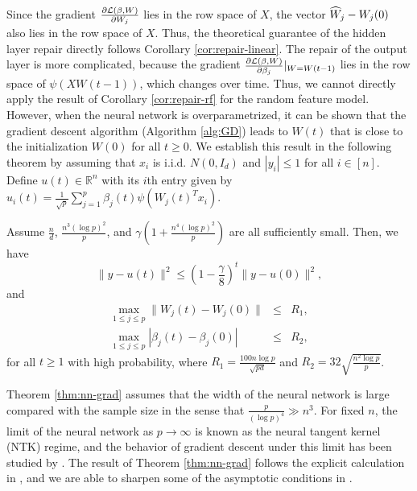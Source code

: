 Since the gradient $\frac{\partial {\mathcal L}(\beta,W)}{\partial W_j}$ lies in the row space of $X$, the vector $\widehat{W}_j-W_j(0)$ also lies in the row space of $X$. Thus, the theoretical guarantee of the hidden layer repair directly follows
Corollary \ref{cor:repair-linear}.
The repair of the output layer is more complicated, because the gradient $\frac{\partial {\mathcal L}(\beta,W)}{\partial \beta_j}|_{W=W(t-1)}$ lies in the row space of $\psi(XW(t-1))$, which changes over time. Thus, we cannot directly apply the result of Corollary \ref{cor:repair-rf} for the random feature model. However, when the neural network is overparametrized, it can be shown that the gradient descent algorithm (Algorithm \ref{alg:GD}) leads to $W(t)$ that is close to the initialization $W(0)$ for all $t\geq 0$. We establish this result in the following theorem by assuming that $x_i$ is i.i.d. $N(0,I_d)$ and $|y_i|\leq 1$ for all $i\in[n]$. Define $u(t)\in\mathbb{R}^n$ with its $i$th entry given by
$u_i(t)=\frac{1}{\sqrt{p}}\sum_{j=1}^p\beta_j(t)\psi(W_j(t)^Tx_i)$.
\vskip10pt
\begin{thm}\label{thm:nn-grad}
Assume $\frac{n}{d}$, $\frac{n^3(\log p)^2}{p}$, and $\gamma\left(1+\frac{n^4(\log p)^2}{p}\right)$ are all sufficiently small. Then, we have
\begin{equation}
\|y-u(t)\|^2 \leq \left(1-\frac{\gamma}{8}\right)^t\|y-u(0)\|^2, \label{eq:iter-function}
\end{equation}
and
\begin{eqnarray}
\label{eq:iter-parameter} \max_{1\leq j\leq p}\|W_j(t)-W_j(0)\| &\leq& R_1, \\
\label{eq:iter-parameter-beta} \max_{1\leq j\leq p}|\beta_j(t)-\beta_j(0)| &\leq& R_2,
\end{eqnarray}
for all $t\geq 1$ with high probability, where $R_1=\frac{100n\log p}{\sqrt{pd}}$ and $R_2=32\sqrt{\frac{n^2\log p}{p}}$.
\end{thm}

Theorem \ref{thm:nn-grad} assumes that the width of the neural network is large compared with the sample size in the sense that $\frac{p}{(\log p)^4}\gg n^3$. For fixed $n$, the limit of the neural network as $p\rightarrow\infty$ is known as the neural tangent kernel (NTK) regime, and the behavior of gradient descent under this limit has been studied by \cite{jacot2018neural}. The result of Theorem \ref{thm:nn-grad} follows the explicit calculation in \cite{du2018gradient}, and we are able to sharpen some of the asymptotic conditions in \cite{du2018gradient}.

